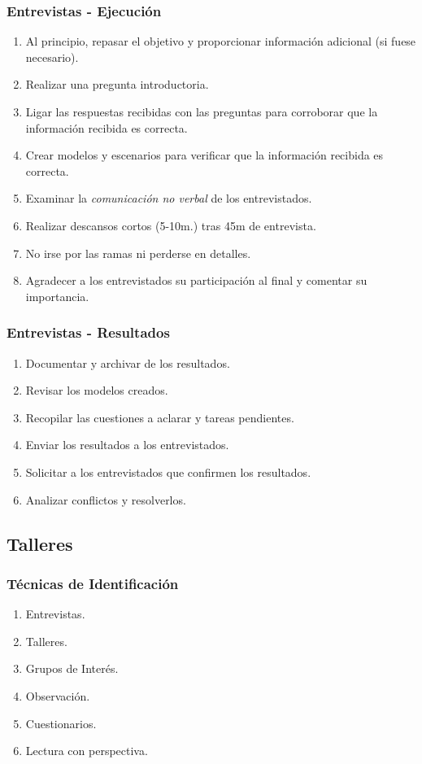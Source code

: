 ﻿\documentclass[handout,a4paper,slidestop,xcolor=pst,dvips,blue]{beamer}
\begin{document}
\begin{frame}[c]
    \frametitle{Entrevistas - Ejecución}
    \begin{enumerate}[<+->]
        \item Al principio, repasar el objetivo y proporcionar información adicional (si fuese necesario).
        \item Realizar una pregunta introductoria.
        \item Ligar las respuestas recibidas con las preguntas para corroborar que la información recibida es correcta.
        \item Crear modelos y escenarios para verificar que la información recibida es correcta.
        \item Examinar la \emph{comunicación no verbal} de los entrevistados.
        \item Realizar descansos cortos (5-10m.) tras 45m de entrevista.
        \item No irse por las ramas ni perderse en detalles.
        \item Agradecer a los entrevistados su participación al final y comentar su importancia.
    \end{enumerate}
\end{frame}

\begin{frame}[c]
    \frametitle{Entrevistas - Resultados}
    \begin{enumerate}[<+->]
        \item Documentar y archivar  de los resultados.
        \item Revisar los modelos creados.
        \item Recopilar las cuestiones a aclarar y tareas pendientes.
        \item Enviar los resultados a los entrevistados.
        \item Solicitar a los entrevistados que confirmen los resultados.
        \item Analizar conflictos y resolverlos.
    \end{enumerate}
\end{frame}

\subsection{Talleres}

\begin{frame}[c]
    \frametitle{Técnicas de Identificación}
    \begin{enumerate}
         \item Entrevistas.
         \item \alert{Talleres}.
         \item Grupos de Interés.
         \item Observación.
         \item Cuestionarios.
         \item Lectura con perspectiva.
    \end{enumerate}
\end{frame}
\end{document}
